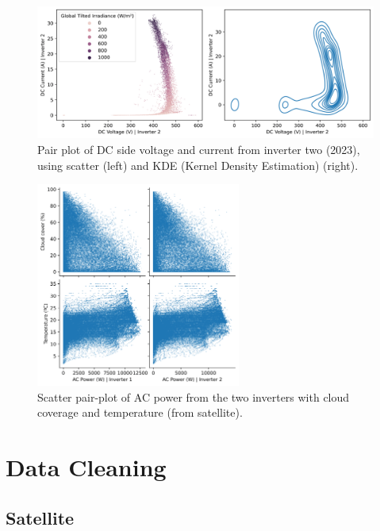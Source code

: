 \begin{figure}[h]
    \centering
    \includegraphics[width=\textwidth]{figures/appendix/b_analysis/07_voltage_current_pairplot_test_2-1.png}
    \caption{Pair plot of DC side voltage and current from inverter two (2023), using scatter (left) and KDE (Kernel Density Estimation) (right).}
    \label{fig:eda_voltage_current_test_2}
\end{figure}

\begin{figure}[h]
    \centering
    \includegraphics[width=0.6\textwidth]{figures/appendix/b_analysis/12_power_meteo_pairplot_kb-1.png}
    \caption{Scatter pair-plot of AC power from the two inverters with cloud coverage and temperature (from satellite).}
    \label{fig:eda_irrelevant_meteo}
\end{figure}

\FloatBarrier

\section{Data Cleaning}

\subsection{Satellite}

